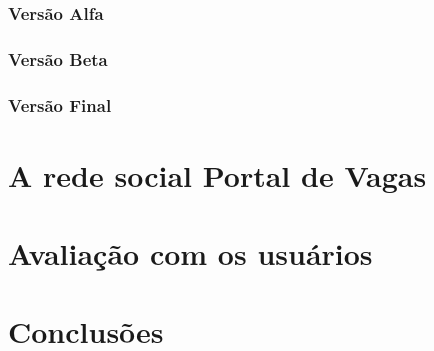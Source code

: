 \documentclass[cic,tc]{iiufrgs}
\begin{document}
\subsection{Versão Alfa}
\label{implementacaoAR}

\subsection{Versão Beta}
\label{implementacaoBR}

\subsection{Versão Final}
\label{implementacaoFR}

\chapter{A rede social Portal de Vagas}
\label{redeSocialPortal}

\chapter{Avaliação com os usuários}
\label{Avaliação}

\chapter{Conclusões}
\label{conclusao}






\end{document}
